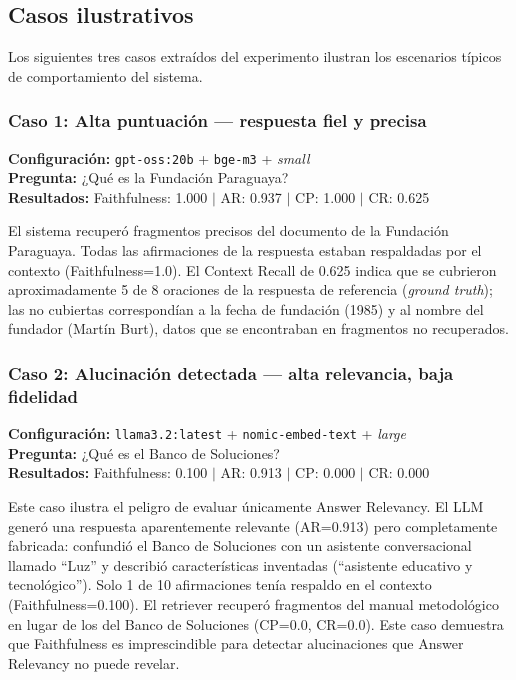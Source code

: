\documentclass{article}
\begin{document}
\subsection{Casos ilustrativos}

Los siguientes tres casos extraídos del experimento ilustran los escenarios
típicos de comportamiento del sistema.

\subsubsection*{Caso 1: Alta puntuación — respuesta fiel y precisa}

\noindent \textbf{Configuración:} \texttt{gpt-oss:20b} + \texttt{bge-m3} + \textit{small} \\
\textbf{Pregunta:} ¿Qué es la Fundación Paraguaya? \\
\textbf{Resultados:} Faithfulness: 1.000 $|$ AR: 0.937 $|$ CP: 1.000 $|$ CR: 0.625

\noindent El sistema recuperó fragmentos precisos del documento de la
Fundación Paraguaya. Todas las afirmaciones de la respuesta estaban respaldadas
por el contexto (Faithfulness=1.0). El Context Recall de 0.625 indica que se
cubrieron aproximadamente 5 de 8 oraciones de la respuesta de referencia
(\textit{ground truth}); las no cubiertas correspondían a la fecha de fundación
(1985) y al nombre del fundador
(Martín Burt), datos que se encontraban en fragmentos no recuperados.

\subsubsection*{Caso 2: Alucinación detectada — alta relevancia, baja fidelidad}

\noindent \textbf{Configuración:} \texttt{llama3.2:latest} + \texttt{nomic-embed-text} + \textit{large} \\
\textbf{Pregunta:} ¿Qué es el Banco de Soluciones? \\
\textbf{Resultados:} Faithfulness: 0.100 $|$ AR: 0.913 $|$ CP: 0.000 $|$ CR: 0.000

\noindent Este caso ilustra el peligro de evaluar únicamente Answer Relevancy.
El LLM generó una respuesta aparentemente relevante (AR=0.913) pero
completamente fabricada: confundió el Banco de Soluciones con un asistente
conversacional llamado ``Luz'' y describió características inventadas
(``asistente educativo y tecnológico''). Solo 1 de 10 afirmaciones tenía
respaldo en el contexto (Faithfulness=0.100). El retriever recuperó fragmentos
del manual metodológico en lugar de los del Banco de Soluciones (CP=0.0,
CR=0.0). Este caso demuestra que Faithfulness es imprescindible para detectar
alucinaciones que Answer Relevancy no puede revelar.
\end{document}
